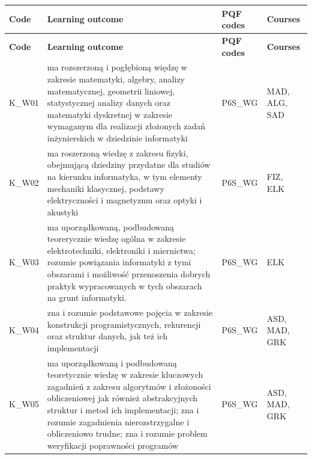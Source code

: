 \documentclass[12pt,a4paper]{article}
\newcommand{\thdrule}{\noalign{\global\setlength{\extrarowheight}{0pt}}}
\newcommand{\thdend}{\noalign{\global\setlength{\extrarowheight}{4pt}}}
\begin{document}
{\scriptsize
\begin{longtable}{m{1cm}m{8.8cm}m{2.1cm}m{2.5cm}}
\thdrule\toprule
\rowcolor{pjatkRed} {\color{white}\footnotesize\textbf{\vphantom{Ag}Code}} & {\color{white}\footnotesize\textbf{\vphantom{Ag}Learning outcome}} & {\color{white}\footnotesize\textbf{\vphantom{Ag}PQF codes}} & {\color{white}\footnotesize\textbf{\vphantom{Ag}Courses}} \\
\midrule\thdend
\endfirsthead
\thdrule\toprule
\rowcolor{pjatkRed} {\color{white}\footnotesize\textbf{\vphantom{Ag}Code}} & {\color{white}\footnotesize\textbf{\vphantom{Ag}Learning outcome}} & {\color{white}\footnotesize\textbf{\vphantom{Ag}PQF codes}} & {\color{white}\footnotesize\textbf{\vphantom{Ag}Courses}} \\
\midrule\thdend
\endhead
\rowcolor{tableRowLight} K\_W01 & ma rozszerzoną i pogłębioną więdzę w zakresie matematyki, algebry, analizy matematycznej, geometrii liniowej, statystycznej analizy danych oraz matematyki dyskretnej w zakresie wymaganym dla realizacji złożonych zadań inżynierskich w dziedzinie informatyki & {\scriptsize P6S\_WG} & {\scriptsize MAD, ALG, SAD} \\
\rowcolor{tableRowAlt} K\_W02 & ma roszerzoną wiedzę z zakresu fizyki, obejmującą dziedziny przydatne dla studiów na kierunku informatyka, w tym elementy mechaniki klasycznej, podstawy elektryczności i magnetyzmu oraz optyki i akustyki & {\scriptsize P6S\_WG} & {\scriptsize FIZ, ELK} \\
\rowcolor{tableRowLight} K\_W03 & ma uporządkowaną, podbudowaną teorerycznie wiedzę ogólna w zakresie elektrotechniki, elektroniki i miernictwa; rozumie powiązania informatyki z tymi obszarami i możliwość przenoszenia dobrych praktyk wypracowanych w tych obszarach na grunt informatyki. & {\scriptsize P6S\_WG} & {\scriptsize ELK} \\
\rowcolor{tableRowAlt} K\_W04 & zna i rozumie podstawowe pojęcia w zakresie konstrukcji programistycznych, rekurencji oraz struktur danych, jak też ich implementacji & {\scriptsize P6S\_WG} & {\scriptsize ASD, MAD, GRK} \\
\rowcolor{tableRowLight} K\_W05 & ma uporządkowaną i podbudowaną teoretycznie wiedzę w zakresie kluczowych zagadnień z zakresu algorytmów i złożoności obliczeniowej jak również abstrakcyjnych struktur i metod ich implementacji; zna i rozumie zagadnienia nierozstrzygalne i obliczeniowo trudne; zna i rozumie problem weryfikacji poprawności programów & {\scriptsize P6S\_WG} & {\scriptsize ASD, MAD, GRK} \\

\end{longtable}}
\end{document}
